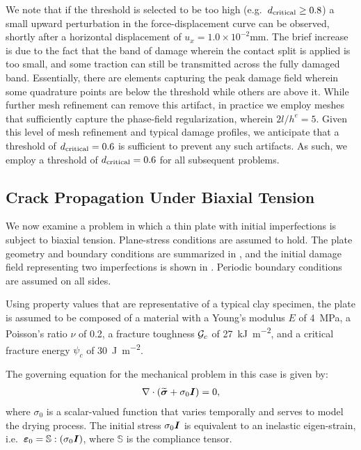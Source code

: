 We note that if the threshold is selected to be too high (e.g.\ $d_{\text{critical}} \ge 0.8$) a small upward perturbation in the force-displacement curve can be observed, shortly after a horizontal displacement of $u_x = 1.0\times 10^{-2}$mm.  The brief increase is due to the fact that the band of damage wherein the contact split is applied is too small, and some traction can still be transmitted across the fully damaged band.  Essentially, there are elements capturing the peak damage field wherein some quadrature points are below the threshold while others are above it.
While further mesh refinement can remove this artifact, in practice we employ meshes that sufficiently capture the phase-field regularization, wherein $ 2 l / h^e = 5$.  Given this level of mesh refinement and typical damage profiles, we anticipate that a threshold of $d_{\text{critical}} = 0.6$ is sufficient to prevent any such artifacts.  As such, we employ a threshold of $d_{\text{critical}} = 0.6$ for all subsequent problems.

\subsection{Crack Propagation Under Biaxial Tension}

We now examine a problem in which a thin plate  with initial imperfections is subject to biaxial tension.  Plane-stress conditions are assumed to hold. The plate geometry and boundary conditions are summarized in , and the initial damage field representing two imperfections is shown in .  Periodic boundary conditions are assumed on all sides.

Using property values that are representative of a typical clay specimen, the plate is assumed to be composed of a material with a Young's modulus $E$ of \SI{4}{\mega\pascal}, a Poisson's ratio $\nu$ of 0.2, a fracture toughness ${\mathcal{G}_c}$ of \SI{27}{\kilo\joule\per\square\meter}, and a critical fracture energy $\psi_c$ of \SI{30}{\joule\per\square\meter}.

The governing equation for the mechanical problem in this case is given by:
\begin{align}
  \label{eq:biaxial}
  \nabla \cdot \left( \widetilde{\boldsymbol{\sigma}} + \sigma_0\boldsymbol{I} \right) = 0 ,
\end{align}
where $\sigma_0$ is a scalar-valued function that varies temporally and serves to model the drying process. The initial stress $\sigma_0\boldsymbol{I}$ is equivalent to an inelastic eigen-strain, i.e.\ $\boldsymbol{\varepsilon}_0 = \mathbb{S}:(\sigma_0\boldsymbol{I})$, where $\mathbb{S}$ is the compliance tensor.

